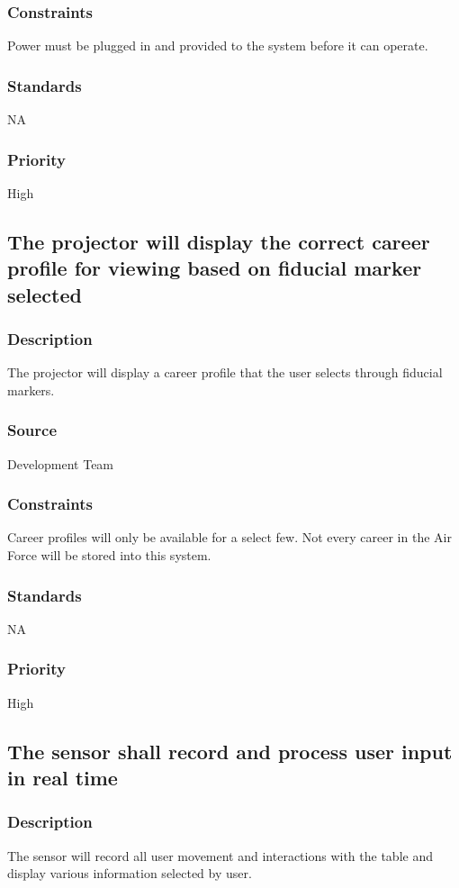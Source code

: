 \subsubsection{Constraints}
Power must be plugged in and provided to the system before it can operate.
\subsubsection{Standards}
NA
\subsubsection{Priority}
High

\subsection{The projector will display the correct career profile for viewing based on fiducial marker selected }
\subsubsection{Description}
The projector will display a career profile that the user selects through fiducial markers.
\subsubsection{Source}
Development Team
\subsubsection{Constraints}
Career profiles will only be available for a select few. Not every career in the Air Force will be stored into this system.
\subsubsection{Standards}
NA
\subsubsection{Priority}
High

\subsection{The sensor shall record and process user input in real time }
\subsubsection{Description}
The sensor will record all user movement and interactions with the table and display various information selected by user.
